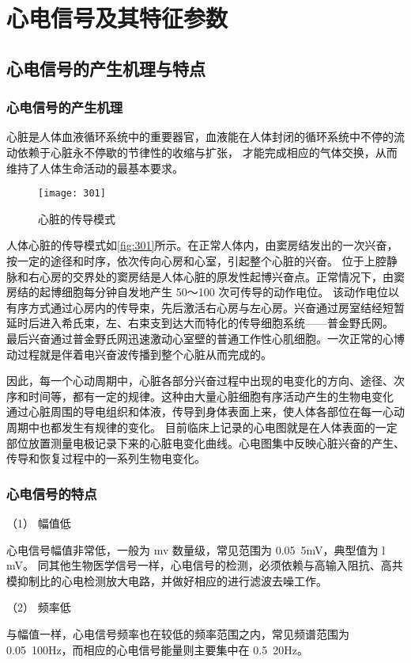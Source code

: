 \chapter{心电信号及其特征参数 }
\section{心电信号的产生机理与特点}
\subsection{心电信号的产生机理} 
心脏是人体血液循环系统中的重要器官，血液能在人体封闭的循环系统中不停的流动依赖于心脏永不停歇的节律性的收缩与扩张，
才能完成相应的气体交换，从而维持了人体生命活动的最基本要求\cite{8}。 
\begin{figure}[htbp]
    \centering
    \texttt{[image: 301]}
    \caption{\label{fig:301}心脏的传导模式}
\end{figure}

人体心脏的传导模式如\autoref{fig:301}所示。在正常人体内，由窦房结发出的一次兴奋，按一定的途径和时序，依次传向心房和心室，引起整个心脏的兴奋。
位于上腔静脉和右心房的交界处的窦房结是人体心脏的原发性起博兴奋点。正常情况下，由窦房结的起博细胞每分钟自发地产生 50～100 次可传导的动作电位。
该动作电位以有序方式通过心房内的传导束，先后激活右心房与左心房。兴奋通过房室结经短暂延时后进入希氏束，左、右束支到达大而特化的传导细胞系统——普金野氏网。
最后兴奋通过普金野氏网迅速激动心室壁的普通工作性心肌细胞。一次正常的心博动过程就是伴着电兴奋波传播到整个心脏从而完成的。 

因此，每一个心动周期中，心脏各部分兴奋过程中出现的电变化的方向、途径、次序和时间等，都有一定的规律。这种由大量心脏细胞有序活动产生的生物电变化
通过心脏周围的导电组织和体液，传导到身体表面上来，使人体各部位在每一心动周期中也都发生有规律的变化。
目前临床上记录的心电图就是在人体表面的一定部位放置测量电极记录下来的心脏电变化曲线。心电图集中反映心脏兴奋的产生、传导和恢复过程中的一系列生物电变化。 
\subsection{心电信号的特点}
（1）	幅值低 

心电信号幅值非常低，一般为 mv 数量级，常见范围为 0.05~5mV，典型值为 l mV。 
同其他生物医学信号一样，心电信号的检测，必须依赖与高输入阻抗、高共模抑制比的心电检测放大电路，并做好相应的进行滤波去噪工作。 

（2）	频率低 

与幅值一样，心电信号频率也在较低的频率范围之内，常见频谱范围为 0.05~100Hz，而相应的心电信号能量则主要集中在 0.5~20Hz。 

